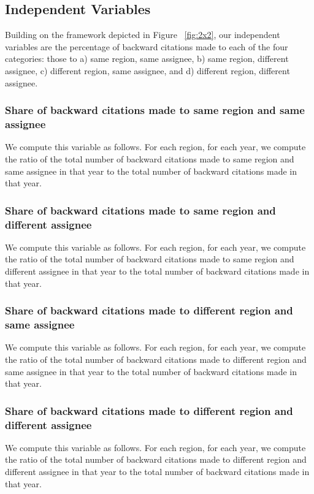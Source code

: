 \documentclass[12pt,letterpaper]{article}
\begin{document}
\subsection{Independent Variables}
Building on the framework depicted in Figure ~\ref{fig:2x2}, our independent variables are the percentage of backward citations made to each of the four categories: those to a) same region, same assignee, b) same region, different assignee, c) different region, same assignee, and d) different region, different assignee. \par
\subsubsection{Share of backward citations made to same region and same assignee}
We compute this variable as follows. For each region, for each year, we compute the ratio of the total number of backward citations made to same region and same assignee in that year to the total number of backward citations made in that year.
\subsubsection{Share of backward citations made to same region and different assignee}
We compute this variable as follows. For each region, for each year, we compute the ratio of the total number of backward citations made to same region and different assignee in that year to the total number of backward citations made in that year.
\subsubsection{Share of backward citations made to different region and same assignee}
We compute this variable as follows. For each region, for each year, we compute the ratio of the total number of backward citations made to different region and same assignee in that year to the total number of backward citations made in that year.
\subsubsection{Share of backward citations made to different region and different assignee}
We compute this variable as follows. For each region, for each year, we compute the ratio of the total number of backward citations made to different region and different assignee in that year to the total number of backward citations made in that year.\par
\end{document}
